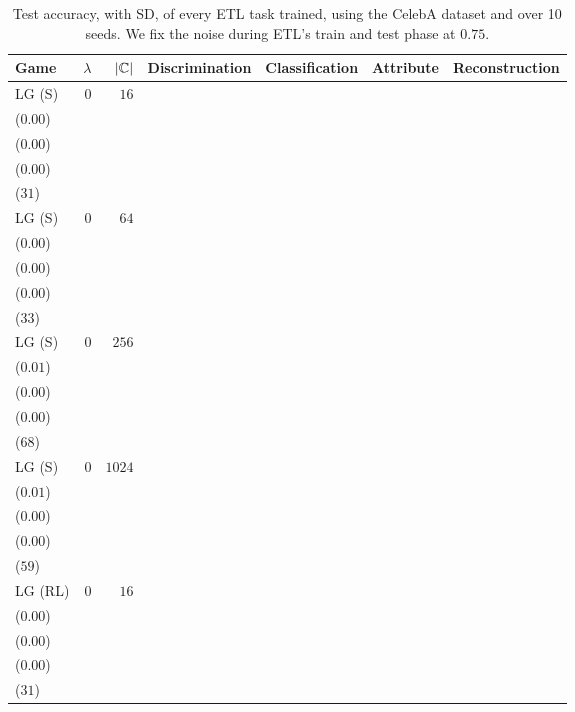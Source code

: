 \begin{table*}[t]
\linespread{0.6}\selectfont\centering
\centering
\caption{Test accuracy, with SD, of every ETL task trained, using the CelebA dataset and over 10 seeds. We fix the noise during ETL's train and test phase at \(0.75\).}
\label{table:etl_celeba_075_eval}
\begin{tabular}{lrrrrrr}
\toprule
Game & \(\lambda\) & \(|\mathcal{{\mathbb{C}}}|\) & \multicolumn{1}{c}{Discrimination} & \multicolumn{1}{c}{Classification} & \multicolumn{1}{c}{Attribute} & \multicolumn{1}{c}{Reconstruction} \\[1ex]
\midrule
LG {\scriptsize(S)} & \(0\) & \(16\) & \longcell{\(0.01\)\\{\tiny(\(0.00\))}} & \longcell{\(0.00\)\\{\tiny(\(0.00\))}} & \longcell{\(0.83\)\\{\tiny(\(0.00\))}} & \longcell{\(6438\)\\{\tiny(\(31\))}} \\[2.2ex]
LG {\scriptsize(S)} & \(0\) & \(64\) & \longcell{\(0.02\)\\{\tiny(\(0.00\))}} & \longcell{\(0.00\)\\{\tiny(\(0.00\))}} & \longcell{\(0.83\)\\{\tiny(\(0.00\))}} & \longcell{\(6357\)\\{\tiny(\(33\))}} \\[2.2ex]
LG {\scriptsize(S)} & \(0\) & \(256\) & \longcell{\(0.03\)\\{\tiny(\(0.01\))}} & \longcell{\(0.00\)\\{\tiny(\(0.00\))}} & \longcell{\(0.83\)\\{\tiny(\(0.00\))}} & \longcell{\(6311\)\\{\tiny(\(68\))}} \\[2.2ex]
LG {\scriptsize(S)} & \(0\) & \(1024\) & \longcell{\(0.03\)\\{\tiny(\(0.01\))}} & \longcell{\(0.00\)\\{\tiny(\(0.00\))}} & \longcell{\(0.83\)\\{\tiny(\(0.00\))}} & \longcell{\(6316\)\\{\tiny(\(59\))}} \\[2.2ex]
LG {\scriptsize(RL)} & \(0\) & \(16\) & \longcell{\(0.02\)\\{\tiny(\(0.00\))}} & \longcell{\(0.00\)\\{\tiny(\(0.00\))}} & \longcell{\(0.84\)\\{\tiny(\(0.00\))}} & \longcell{\(6331\)\\{\tiny(\(31\))}} \\[2.2ex]

\end{tabular}
\end{table*}
